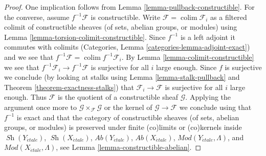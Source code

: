 \documentclass[10pt,a4paper]{amsart}
\theoremstyle{plain}
\theoremstyle{definition}
\theoremstyle{remark}
\numberwithin{equation}{subsection}
\def\colim{\mathop{\mathrm{colim}}\nolimits}
\def\Sh{\mathop{\mathit{Sh}}\nolimits}
\def\etale{{\acute{e}tale}}
\begin{document}
\begin{proof}
One implication follows from Lemma \ref{lemma-pullback-constructible}.
For the converse, assume $f^{-1}\mathcal{F}$ is constructible.
Write $\mathcal{F} = \colim \mathcal{F}_i$ as a
filtered colimit of constructible sheaves (of sets, abelian groups, or modules)
using Lemma \ref{lemma-torsion-colimit-constructible}.
Since $f^{-1}$ is a left adjoint it commutes with colimits
(Categories, Lemma \ref{categories-lemma-adjoint-exact}) and we see that
$f^{-1}\mathcal{F} = \colim f^{-1}\mathcal{F}_i$.
By Lemma \ref{lemma-colimit-constructible} we see that
$f^{-1}\mathcal{F}_i \to f^{-1}\mathcal{F}$
is surjective for all $i$ large enough.
Since $f$ is surjective we conclude (by looking at stalks using
Lemma \ref{lemma-stalk-pullback} and
Theorem \ref{theorem-exactness-stalks})
that $\mathcal{F}_i \to \mathcal{F}$ is surjective for all $i$ large enough.
Thus $\mathcal{F}$ is the quotient of a constructible sheaf $\mathcal{G}$.
Applying the argument once more to
$\mathcal{G} \times_\mathcal{F} \mathcal{G}$ or
the kernel of $\mathcal{G} \to \mathcal{F}$
we conclude using that $f^{-1}$ is exact and that the category of
constructible sheaves (of sets, abelian groups, or modules) is
preserved under finite (co)limits or (co)kernels inside
$\Sh(Y_\etale)$, $\Sh(X_\etale)$, $\textit{Ab}(Y_\etale)$,
$\textit{Ab}(X_\etale)$, $\textit{Mod}(Y_\etale, \Lambda)$, and
$\textit{Mod}(X_\etale, \Lambda)$, see
Lemma \ref{lemma-constructible-abelian}.
\end{proof}
\end{document}
